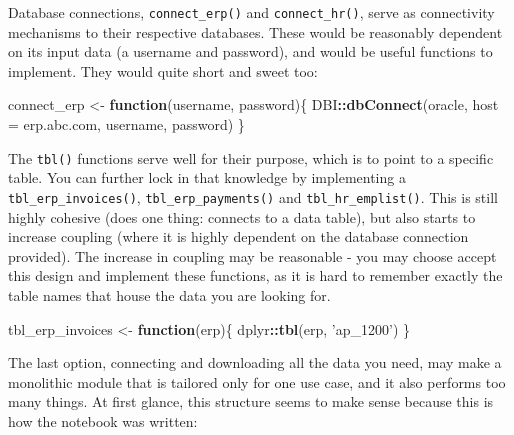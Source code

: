 \documentclass[
]{book}
\newenvironment{Shaded}{\begin{snugshade}}{\end{snugshade}}
\newcommand{\ControlFlowTok}[1]{\textcolor[rgb]{0.13,0.29,0.53}{\textbf{#1}}}
\newcommand{\DataTypeTok}[1]{\textcolor[rgb]{0.13,0.29,0.53}{#1}}
\newcommand{\KeywordTok}[1]{\textcolor[rgb]{0.13,0.29,0.53}{\textbf{#1}}}
\newcommand{\NormalTok}[1]{#1}
\newcommand{\OperatorTok}[1]{\textcolor[rgb]{0.81,0.36,0.00}{\textbf{#1}}}
\newcommand{\StringTok}[1]{\textcolor[rgb]{0.31,0.60,0.02}{#1}}
\begin{document}
Database connections, \texttt{connect\_erp()} and \texttt{connect\_hr()}, serve as connectivity mechanisms to their respective databases. These would be reasonably dependent on its input data (a username and password), and would be useful functions to implement. They would quite short and sweet too:

\begin{Shaded}
\begin{Highlighting}[]
\NormalTok{connect_erp <-}\StringTok{ }\ControlFlowTok{function}\NormalTok{(username, password)\{}
\NormalTok{  DBI}\OperatorTok{::}\KeywordTok{dbConnect}\NormalTok{(oracle, }\DataTypeTok{host =}\NormalTok{ erp.abc.com, username, password)}
\NormalTok{\}}
\end{Highlighting}
\end{Shaded}

The \texttt{tbl()} functions serve well for their purpose, which is to point to a specific table. You can further lock in that knowledge by implementing a \texttt{tbl\_erp\_invoices()}, \texttt{tbl\_erp\_payments()} and \texttt{tbl\_hr\_emplist()}. This is still highly cohesive (does one thing: connects to a data table), but also starts to increase coupling (where it is highly dependent on the database connection provided). The increase in coupling may be reasonable - you may choose accept this design and implement these functions, as it is hard to remember exactly the table names that house the data you are looking for.

\begin{Shaded}
\begin{Highlighting}[]
\NormalTok{tbl_erp_invoices <-}\StringTok{ }\ControlFlowTok{function}\NormalTok{(erp)\{}
\NormalTok{  dplyr}\OperatorTok{::}\KeywordTok{tbl}\NormalTok{(erp, }\StringTok{'ap_1200'}\NormalTok{)}
\NormalTok{\}}
\end{Highlighting}
\end{Shaded}

The last option, connecting and downloading all the data you need, may make a monolithic module that is tailored only for one use case, and it also performs too many things. At first glance, this structure seems to make sense because this is how the notebook was written:
\end{document}
